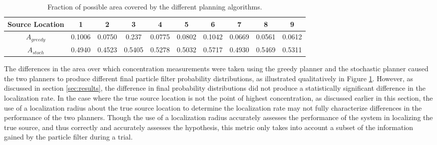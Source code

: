 \documentclass[submit, 12pt]{aiaa-pretty-modified}
\begin{document}
\begin{table}[htb]
\begin{center}
\begin{tabular}{|c||c||c||c||c||c||c||c||c||c|}
\hline
 Source Location & 1 & 2 & 3 & 4 & 5 & 6 & 7 & 8 & 9 \\
\hline \hline
$A_{greedy}$ & 0.1006 & 0.0750 & 0.237 & 0.0775 & 0.0802 & 0.1042 & 0.0669 & 0.0561 & 0.0612 \\
\hline
$A_{stoch}$ & 0.4940 & 0.4523 & 0.5405 & 0.5278 & 0.5032 & 0.5717 & 0.4930 & 0.5469 & 0.5311 \\
\hline
\end{tabular}
\caption{Fraction of possible area covered by the different planning algorithms.}
\label{tab:paths}
\end{center}
\end{table}

The differences in the area over which concentration measurements were
taken using the greedy planner and the stochastic planner caused the
two planners
to produce different final particle filter probability distributions,
as illustrated qualitatively in Figure \ref{tab:paths}.  However, as
discussed in section \ref{sec:results}, the difference in final
probability distributions did not produce a statistically significant
difference in the localization rate.  In the case where the true source location is
not the point of highest concentration, as discussed earlier in this section, the use of a localization radius about
the true source location
to determine the localization rate may not fully characterize
differences in the performance of the two planners.  Though the use of a
localization radius accurately
assesses the performance of the system in localizing the true source,
and thus correctly and accurately assesses the hypothesis, this metric only takes
into account a subset of the information gained by the particle filter
during a trial.
\end{document}
